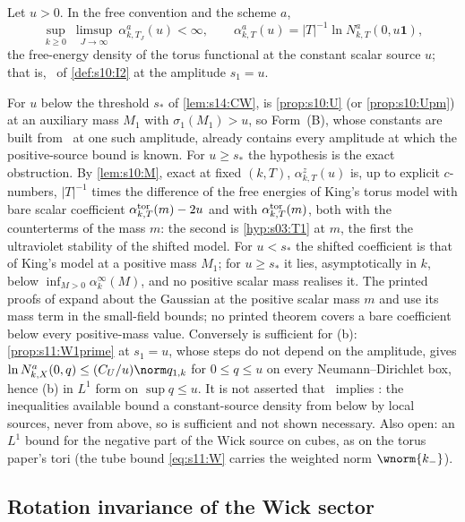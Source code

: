 \begin{hypothesis}\label{hyp:s23:Bminus}
Let $u>0$. In the free convention and the scheme $a$,
\[
\sup_{k\ge0}\ \limsup_{J\to\infty}\ \alpha^a_{k,T_J}(u)<\infty,\qquad\alpha^a_{k,T}(u)=|T|^{-1}\ln N^a_{k,T}(0,u\mathbf 1),
\]
the free-energy density of the torus functional at the constant scalar source $u$; that is, \Itwo\ of \cref{def:s10:I2} at the amplitude $s_1=u$.
\end{hypothesis}

For $u$ below the threshold $s_*$ of \cref{lem:s14:CW},  is \cref{prop:s10:U} (or \cref{prop:s10:Upm}) at an auxiliary mass $M_1$ with $\sigma_1(M_1)>u$, so Form~(B), whose constants are built from \Itwo\ at one such amplitude, already contains every amplitude at which the positive-source bound is known. For $u\ge s_*$ the hypothesis is the exact obstruction. By \cref{lem:s10:M}, exact at fixed $(k,T)$, $\alpha^z_{k,T}(u)$ is, up to explicit $c$-numbers, $|T|^{-1}$ times the difference of the free energies of King's torus model with bare scalar coefficient $\alpha^{\rm tor}_{k,T}(m)-2u$ and with $\alpha^{\rm tor}_{k,T}(m)$, both with the counterterms of the mass $m$: the second is \cref{hyp:s03:T1} at $m$, the first the ultraviolet stability of the shifted model. For $u<s_*$ the shifted coefficient is that of King's model at a positive mass $M_1$; for $u\ge s_*$ it lies, asymptotically in $k$, below $\inf_{M>0}\alpha^\infty_k(M)$, and no positive scalar mass realises it. The printed proofs of \cite{Ba1,Ba2} expand about the Gaussian at the positive scalar mass $m$ and use its mass term in the small-field bounds; no printed theorem covers a bare coefficient below every positive-mass value. Conversely  is sufficient for \Wtwo(b): \cref{prop:s11:W1prime} at $s_1=u$, whose steps do not depend on the amplitude, gives $\ln N^a_{k,X}(0,q)\le(C_U/u)\norm q_{1,k}$ for $0\le q\le u$ on every Neumann--Dirichlet box, hence \Wtwo(b) in $L^1$ form on $\sup q\le u$. It is not asserted that \Wtwo\ implies : the inequalities available bound a constant-source density from below by local sources, never from above, so  is sufficient and not shown necessary. Also open: an $L^1$ bound for the negative part of the Wick source on cubes, as on the torus paper's tori (the tube bound \eqref{eq:s11:W} carries the weighted norm $\wnorm{k_-}$).

\subsection{Rotation invariance of the Wick sector}

